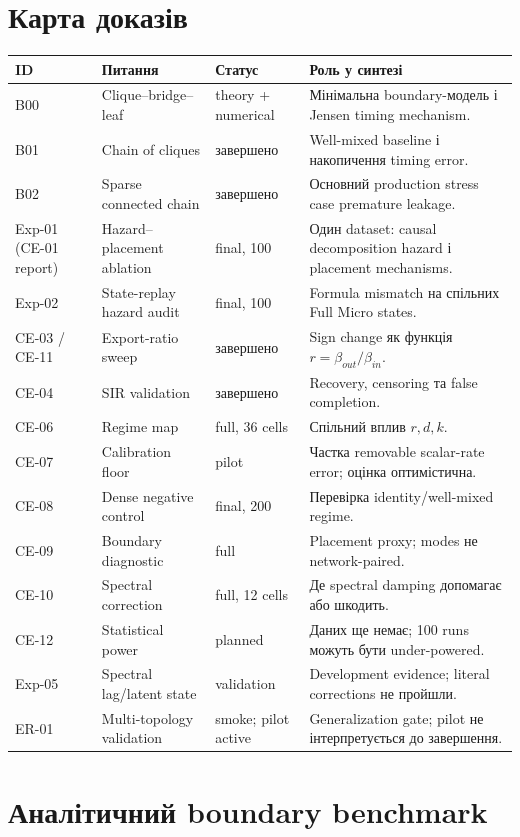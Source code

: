 \documentclass[11pt,a4paper]{article}
\begin{document}
\section{Карта доказів}

\begin{longtable}{p{2.1cm}p{4.0cm}p{2.1cm}p{6.0cm}}
\toprule
ID & Питання & Статус & Роль у синтезі\\
\midrule
\endhead
B00 & Clique--bridge--leaf & theory + numerical & Мінімальна boundary-модель і Jensen timing mechanism.\\
B01 & Chain of cliques & завершено & Well-mixed baseline і накопичення timing error.\\
B02 & Sparse connected chain & завершено & Основний production stress case premature leakage.\\
Exp-01 (CE-01 report) & Hazard--placement ablation & final, 100 & Один dataset: causal decomposition hazard і placement mechanisms.\\
Exp-02 & State-replay hazard audit & final, 100 & Formula mismatch на спільних Full Micro states.\\
CE-03 / CE-11 & Export-ratio sweep & завершено & Sign change як функція $r=\beta_{out}/\beta_{in}$.\\
CE-04 & SIR validation & завершено & Recovery, censoring та false completion.\\
CE-06 & Regime map & full, 36 cells & Спільний вплив $r,d,k$.\\
CE-07 & Calibration floor & pilot & Частка removable scalar-rate error; оцінка оптимістична.\\
CE-08 & Dense negative control & final, 200 & Перевірка identity/well-mixed regime.\\
CE-09 & Boundary diagnostic & full & Placement proxy; modes не network-paired.\\
CE-10 & Spectral correction & full, 12 cells & Де spectral damping допомагає або шкодить.\\
CE-12 & Statistical power & planned & Даних ще немає; 100 runs можуть бути under-powered.\\
Exp-05 & Spectral lag/latent state & validation & Development evidence; literal corrections не пройшли.\\
ER-01 & Multi-topology validation & smoke; pilot active & Generalization gate; pilot не інтерпретується до завершення.\\
\bottomrule
\end{longtable}

\section{Аналітичний boundary benchmark}
\end{document}
